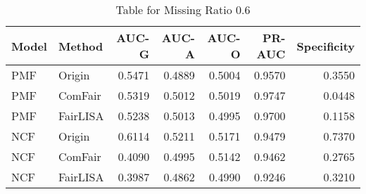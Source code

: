 \begin{table}
\centering
\caption{Table for Missing Ratio 0.6}
\label{tab:missing_0.6}
\begin{tabular}{llrrrrr}
\toprule
Model &   Method &  AUC-G &  AUC-A &  AUC-O &  PR-AUC &  Specificity \\
\midrule
  PMF &   Origin & 0.5471 & 0.4889 & 0.5004 &  0.9570 &       0.3550 \\
  PMF &  ComFair & 0.5319 & 0.5012 & 0.5019 &  0.9747 &       0.0448 \\
  PMF & FairLISA & 0.5238 & 0.5013 & 0.4995 &  0.9700 &       0.1158 \\
  NCF &   Origin & 0.6114 & 0.5211 & 0.5171 &  0.9479 &       0.7370 \\
  NCF &  ComFair & 0.4090 & 0.4995 & 0.5142 &  0.9462 &       0.2765 \\
  NCF & FairLISA & 0.3987 & 0.4862 & 0.4990 &  0.9246 &       0.3210 \\
\bottomrule
\end{tabular}
\end{table}
